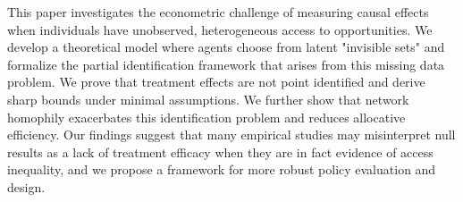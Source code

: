 This paper investigates the econometric challenge of measuring causal effects when individuals have unobserved, heterogeneous access to opportunities.
We develop a theoretical model where agents choose from latent "invisible sets" and formalize the partial identification framework that arises from this missing data problem.
We prove that treatment effects are not point identified and derive sharp bounds under minimal assumptions. We further show that network homophily exacerbates this identification problem and reduces allocative efficiency.
Our findings suggest that many empirical studies may misinterpret null results as a lack of treatment efficacy when they are in fact evidence of access inequality, and we propose a framework for more robust policy evaluation and design.